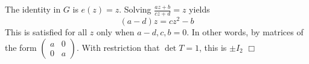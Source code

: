 \documentclass{article}
\begin{document}
\subsection{}
The identity in $G$ is $e(z) = z$. Solving $\frac{az+b}{cz+d} = z$ yields 
$$(a-d)z = cz^2 -b$$
This is satisfied for all $z$ only when $a-d,c,b = 0$. In other words, by matrices of the form $\left(\begin{matrix}a&0\\0&a\end{matrix}\right)$. With restriction that $\det T = 1$, this is $\pm I_2$ $\Box$
\end{document}
